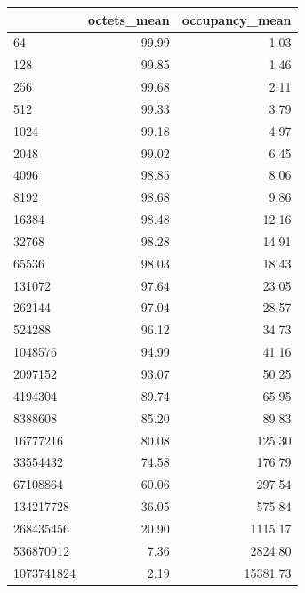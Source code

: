 \begin{tabular}{lrr}
\toprule
 & octets_mean & occupancy_mean \\
\midrule
64 & 99.99 & 1.03 \\
128 & 99.85 & 1.46 \\
256 & 99.68 & 2.11 \\
512 & 99.33 & 3.79 \\
1024 & 99.18 & 4.97 \\
2048 & 99.02 & 6.45 \\
4096 & 98.85 & 8.06 \\
8192 & 98.68 & 9.86 \\
16384 & 98.48 & 12.16 \\
32768 & 98.28 & 14.91 \\
65536 & 98.03 & 18.43 \\
131072 & 97.64 & 23.05 \\
262144 & 97.04 & 28.57 \\
524288 & 96.12 & 34.73 \\
1048576 & 94.99 & 41.16 \\
2097152 & 93.07 & 50.25 \\
4194304 & 89.74 & 65.95 \\
8388608 & 85.20 & 89.83 \\
16777216 & 80.08 & 125.30 \\
33554432 & 74.58 & 176.79 \\
67108864 & 60.06 & 297.54 \\
134217728 & 36.05 & 575.84 \\
268435456 & 20.90 & 1115.17 \\
536870912 & 7.36 & 2824.80 \\
1073741824 & 2.19 & 15381.73 \\
\bottomrule
\end{tabular}

